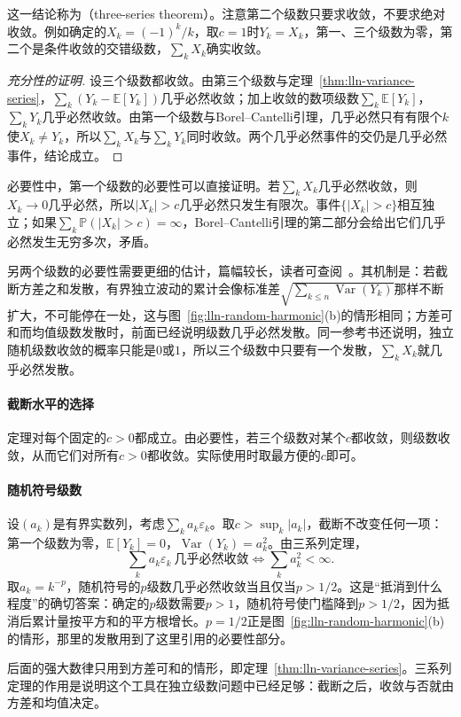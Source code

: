 这一结论称为（three-series theorem）。注意第二个级数只要求收敛，不要求绝对收敛。例如确定的$X_k=(-1)^k/k$，取$c=1$时$Y_k=X_k$，第一、三个级数为零，第二个是条件收敛的交错级数，$\sum_kX_k$确实收敛。

\begin{proof}[充分性的证明]
设三个级数都收敛。由第三个级数与定理~\ref{thm:lln-variance-series}，$\sum_k(Y_k-\mathbb{E}[Y_k])$几乎必然收敛；加上收敛的数项级数$\sum_k\mathbb{E}[Y_k]$，$\sum_kY_k$几乎必然收敛。由第一个级数与Borel–Cantelli引理，几乎必然只有有限个$k$使$X_k\neq Y_k$，所以$\sum_kX_k$与$\sum_kY_k$同时收敛。两个几乎必然事件的交仍是几乎必然事件，结论成立。
\end{proof}

必要性中，第一个级数的必要性可以直接证明。若$\sum_kX_k$几乎必然收敛，则$X_k\to0$几乎必然，所以$\lvert X_k\rvert>c$几乎必然只发生有限次。事件$\{\lvert X_k\rvert>c\}$相互独立；如果$\sum_k\mathbb{P}(\lvert X_k\rvert>c)=\infty$，Borel–Cantelli引理的第二部分会给出它们几乎必然发生无穷多次，矛盾。

另两个级数的必要性需要更细的估计，篇幅较长，读者可查阅~。其机制是：若截断方差之和发散，有界独立波动的累计会像标准差$\sqrt{\sum_{k\leq n}\operatorname{Var}(Y_k)}$那样不断扩大，不可能停在一处，这与图~\ref{fig:lln-random-harmonic}(b)的情形相同；方差可和而均值级数发散时，前面已经说明级数几乎必然发散。同一参考书还说明，独立随机级数收敛的概率只能是$0$或$1$，所以三个级数中只要有一个发散，$\sum_kX_k$就几乎必然发散。

\paragraph{截断水平的选择}
定理对每个固定的$c>0$都成立。由必要性，若三个级数对某个$c$都收敛，则级数收敛，从而它们对所有$c>0$都收敛。实际使用时取最方便的$c$即可。

\paragraph{随机符号级数}
设$(a_k)$是有界实数列，考虑$\sum_ka_k\varepsilon_k$。取$c>\sup_k\lvert a_k\rvert$，截断不改变任何一项：第一个级数为零，$\mathbb{E}[Y_k]=0$，$\operatorname{Var}(Y_k)=a_k^2$。由三系列定理，
\begin{equation}
 \sum_ka_k\varepsilon_k\ \text{几乎必然收敛}\iff\sum_ka_k^2<\infty .
 \label{eq:lln-random-signs}
\end{equation}
取$a_k=k^{-p}$，随机符号的$p$级数几乎必然收敛当且仅当$p>1/2$。这是“抵消到什么程度”的确切答案：确定的$p$级数需要$p>1$，随机符号使门槛降到$p>1/2$，因为抵消后累计量按平方和的平方根增长。$p=1/2$正是图~\ref{fig:lln-random-harmonic}(b)的情形，那里的发散用到了这里引用的必要性部分。

后面的强大数律只用到方差可和的情形，即定理~\ref{thm:lln-variance-series}。三系列定理的作用是说明这个工具在独立级数问题中已经足够：截断之后，收敛与否就由方差和均值决定。
